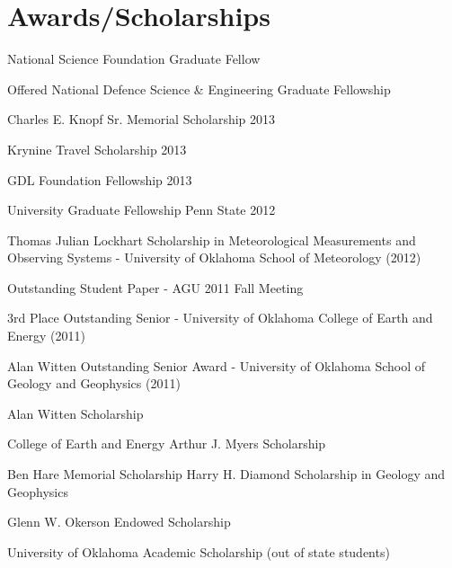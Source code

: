 \documentclass[letterpaper]{article}
\renewenvironment{itemize}{
  \begin{list}{}{
    \setlength{\leftmargin}{1.5em}
  }
}{
  \end{list}
}
\begin{document}

\section*{Awards/Scholarships}
\begin{itemize}
\item National Science Foundation Graduate Fellow
\item Offered National Defence Science & Engineering Graduate Fellowship
\item Charles E. Knopf Sr. Memorial Scholarship 2013
\item Krynine Travel Scholarship 2013
\item GDL Foundation Fellowship 2013 
\item University Graduate Fellowship Penn State 2012
\item Thomas Julian Lockhart Scholarship in Meteorological Measurements and Observing Systems - University of Oklahoma School of Meteorology (2012)
\item Outstanding Student Paper - AGU 2011 Fall Meeting
\item 3rd Place Outstanding Senior - University of Oklahoma College of Earth and Energy (2011)
\item Alan Witten Outstanding Senior Award - University of Oklahoma School of Geology and Geophysics (2011)
\item Alan Witten Scholarship
\item College of Earth and Energy Arthur J. Myers Scholarship 
\item Ben Hare Memorial Scholarship Harry H. Diamond Scholarship in Geology and Geophysics
\item Glenn W. Okerson Endowed Scholarship 
\item University of Oklahoma Academic Scholarship (out of state students)
\end{itemize}
\end{document}
